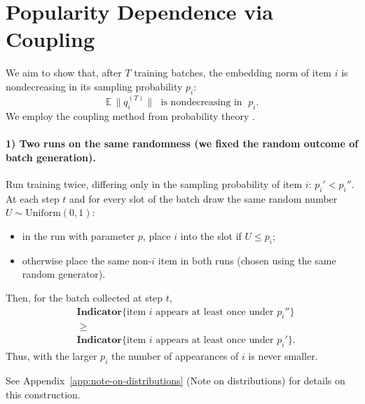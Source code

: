 \section{Popularity Dependence via Coupling}
\label{app:popularity-dependence}

We aim to show that, after $T$ training batches, the embedding norm of item $i$ is nondecreasing in its sampling probability $p_i$:
\begin{equation}
\mathbb E\,\bigl\|q_i^{(T)}\bigr\| \;\text{ is nondecreasing in }\; p_i.
\end{equation}
We employ the coupling method from probability theory \cite{roch_mdp_2024}.

\paragraph{1) Two runs on the same randomness (we fixed the random outcome of batch generation).}
Run training twice, differing only in the sampling probability of item $i$: $p_i' < p_i''$. At each step $t$ and for every slot of the batch draw the same random number $U \sim \mathrm{Uniform}(0,1)$:
\begin{itemize}
  \item in the run with parameter $p$, place $i$ into the slot if $U \le p_i$;
  \item otherwise place the same non-$i$ item in both runs (chosen using the same random generator).
\end{itemize}
Then, for the batch collected at step $t$,
\begin{equation}
\begin{aligned}
&\mathbf{Indicator}\{\text{item } i \text{ appears at least once under } p_i''\} \\
&\;\ge\; \\
&\mathbf{Indicator}\{\text{item } i \text{ appears at least once under } p_i'\}.
\end{aligned}
\end{equation}
Thus, with the larger $p_i$ the number of appearances of $i$ is never smaller.

See Appendix~\ref{app:note-on-distributions} (Note on distributions) for details on this construction.

